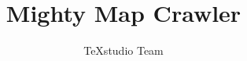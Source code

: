 \documentclass[a4paper,12pt]{report}
\begin{document}
\author{TeXstudio Team}
\title{Mighty Map Crawler}
\maketitle
\tableofcontents




\end{document}
